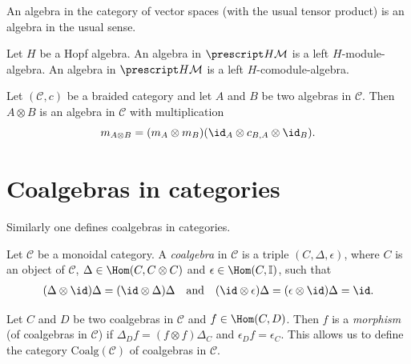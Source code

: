 \begin{example}
An algebra in the category of vector spaces (with the usual tensor product) is an algebra in
the usual sense.
\end{example}

\begin{example}
Let $H$ be a Hopf algebra. An algebra in $\lmod{H}$ is a left $H$-module-algebra. 
An algebra in $\lcomod{H}$ 
is a left 
$H$-comodule-algebra.
\end{example}




\begin{example}
Let $(\mathcal{C},c)$ be a braided category and let $A$ and $B$ be two algebras
in $\mathcal{C}$. Then $A\otimes B$ is an algebra in $\mathcal{C}$ with
multiplication 
\[
m_{A\otimes B}=(m_A\otimes m_B)(\id_A\otimes c_{B,A}\otimes \id_B).
\]
\end{example}

\section{Coalgebras in categories}
Similarly one defines coalgebras in categories.

\begin{definition}
Let $\mathcal{C}$ be a monoidal category. A \emph{coalgebra}
in $\mathcal{C}$ is a triple $(C,\Delta,\epsilon)$, where
$C$ is an object of $\mathcal{C}$, $\Delta\in\Hom(C,C\otimes C)$
and $\epsilon\in\Hom(C,\mathbb{I})$, such that 
\begin{gather*}
(\Delta\otimes\id)\Delta=(\id\otimes\Delta)\Delta\quad\text{and}\quad 
(\id\otimes\epsilon)\Delta=(\epsilon\otimes\id)\Delta=\id.
\end{gather*}
\end{definition}

Let $C$ and $D$ be two coalgebras in $\mathcal{C}$ and $f\in\Hom(C,D)$.
Then $f$ is a \emph{morphism} (of coalgebras in $\mathcal{C}$)
if $\Delta_{D}f=(f\otimes f)\Delta_{C}$ and $\epsilon_{D}f=\epsilon_{C}$. 
This allows us to define the category $\mathrm{Coalg}(\mathcal{C})$
of coalgebras in $\mathcal{C}$.

